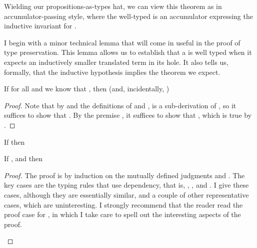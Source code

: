 {Wielding our propositions-as-types hat, we can view this theorem as in
accumulator-passing style, where the well-typed  is an accumulator
expressing the inductive invariant for .

I begin with a minor technical lemma that will come in useful in the proof of
type preservation.
This lemma allows us to establish that a  is well typed when it
expects an inductively smaller translated term in its hole.
It also tells us, formally, that the inductive hypothesis implies the  theorem we expect.
\begin{lemma}
  \label{lem:anf:ih-empty}
  If for all \im{\styjudg{{\slenv}}{{\se}}{{\sA}}} and
  \im{\styjudg{\anfh{\slenv},\edefs{\se}}{\tK}{(\ehole{\se} :
      \anfh{\sA}) \Rightarrow \tB}} we know that
  \im{\styjudg{\anfh{\slenv}}{\anf{\se}{\tK}}{\tB}}, then
  \im{\styjudg{\anfh{\slenv},\edefs{\se}}{\ehole{\se}}{\anfh{\sA}}}
  (and, incidentally, \im{\styjudg{\anfh{\slenv}}{\anfh{\se}}{\anfh{\sA}}})
\end{lemma}
\begin{proof}
  Note that by  and the definitions of \im{\edefs{\se}} and \im{\ehole{\se}},
  \im{\styjudg{\anfh{\slenv},\edefs{\se}}{\ehole{\se}}{\anfh{\sA}}} is a sub-derivation of
  \im{\styjudg{\anfh{\slenv}}{\anfh{\se}}{\anfh{\sA}}}, so
  it suffices to show that \im{\styjudg{\anfh{\slenv}}{\anfh{\se}}{\anfh{\sA}}}.
  By the premise \im{\styjudg{\anfh{\slenv}}{\anf{\se}{\tK}}{\tB}}, it suffices
  to show that \im{\hole : (\_ : \anfh{\sA}) \Rightarrow \anfh{\sA}}, which is
  true by .
\end{proof}

\begin{lemma}
  \label{lem:anf:type-pres}
  \begin{lemmacases}
    \item If \im{\swf{\slenv}} then \im{\swf{\anfh{\slenv}}}
    \item If \im{\styjudg{{\slenv}}{{\se}}{{\sA}}}, and
      \im{\styjudg{\anfh{\slenv},\edefs{\se}}{\tK}{(\ehole{\se} : \anfh{\sA}) \Rightarrow \tB}} then
      \im{\styjudg{\anfh{\slenv}}{\anf{\se}{\tK}}{\tB}}
  \end{lemmacases}
\end{lemma}
\begin{proof}
  The proof is by induction on the mutually defined judgments \im{\swf{\slenv}} and \im{\styjudg{\slenv}{\se}{\sA}}.
  The key cases are the typing rules that use dependency, that is,
  , , and .
  I give these cases, although they are essentially similar, and a couple of other
  representative cases, which are uninteresting.
  I strongly recommend that the reader read the proof case for
  , in which I take care to spell out the interesting aspects
  of the proof.
  \begin{proofcases}
  \item {}


\end{proofcases}
\end{proof}}
